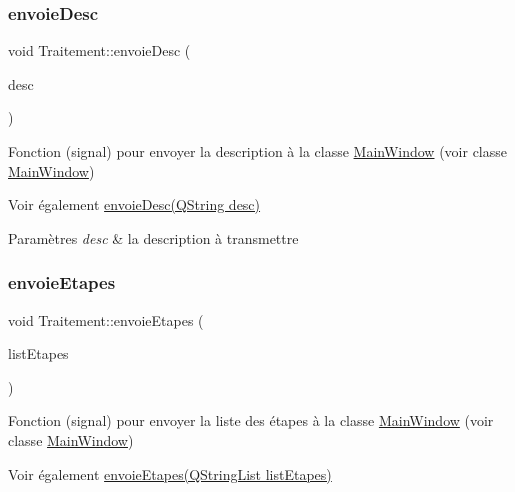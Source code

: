 \subsubsection{\texorpdfstring{envoie\+Desc}{envoieDesc}}
{\footnotesize\ttfamily void Traitement\+::envoie\+Desc (\begin{DoxyParamCaption}\item[{Q\+String}]{desc }\end{DoxyParamCaption})\hspace{0.3cm}{\ttfamily [signal]}}



Fonction (signal) pour envoyer la description à la classe \hyperlink{classMainWindow}{Main\+Window} (voir classe \hyperlink{classMainWindow}{Main\+Window}) 

\begin{DoxySeeAlso}{Voir également}
\hyperlink{classTraitement_afde7a0c290d7bc8204db5bf40d060a2e}{envoie\+Desc(\+Q\+String desc)} 
\end{DoxySeeAlso}

\begin{DoxyParams}{Paramètres}
{\em desc} & la description à transmettre \\
\hline
\end{DoxyParams}
\mbox{\label{classTraitement_af4b22f98a77f850cd0daf20f3cfa7c3a}} 
\subsubsection{\texorpdfstring{envoie\+Etapes}{envoieEtapes}}
{\footnotesize\ttfamily void Traitement\+::envoie\+Etapes (\begin{DoxyParamCaption}\item[{Q\+String\+List}]{list\+Etapes }\end{DoxyParamCaption})\hspace{0.3cm}{\ttfamily [signal]}}



Fonction (signal) pour envoyer la liste des étapes à la classe \hyperlink{classMainWindow}{Main\+Window} (voir classe \hyperlink{classMainWindow}{Main\+Window}) 

\begin{DoxySeeAlso}{Voir également}
\hyperlink{classTraitement_af4b22f98a77f850cd0daf20f3cfa7c3a}{envoie\+Etapes(\+Q\+String\+List list\+Etapes)} 
\end{DoxySeeAlso}

